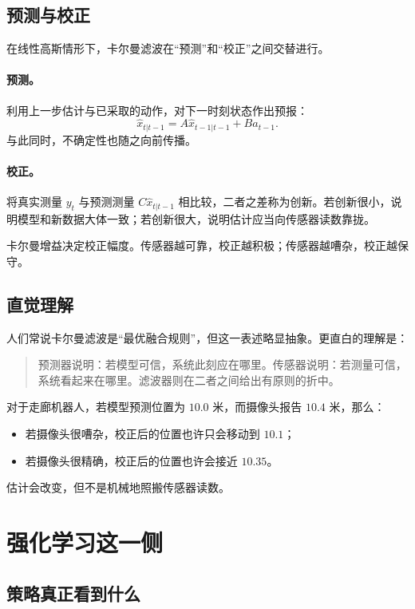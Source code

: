\documentclass[12pt,a4paper]{ctexart}
\begin{document}
\subsection{预测与校正}

在线性高斯情形下，卡尔曼滤波在“预测”和“校正”之间交替进行。

\paragraph{预测。}
利用上一步估计与已采取的动作，对下一时刻状态作出预报：
\[
\hat{x}_{t|t-1} = A \hat{x}_{t-1|t-1} + B a_{t-1}.
\]
与此同时，不确定性也随之向前传播。

\paragraph{校正。}
将真实测量 \(y_t\) 与预测测量 \(C\hat{x}_{t|t-1}\) 相比较，二者之差称为创新。若创新很小，说明模型和新数据大体一致；若创新很大，说明估计应当向传感器读数靠拢。

卡尔曼增益决定校正幅度。传感器越可靠，校正越积极；传感器越嘈杂，校正越保守。

\subsection{直觉理解}

人们常说卡尔曼滤波是“最优融合规则”，但这一表述略显抽象。更直白的理解是：

\begin{quote}
预测器说明：若模型可信，系统此刻应在哪里。传感器说明：若测量可信，系统看起来在哪里。滤波器则在二者之间给出有原则的折中。
\end{quote}

对于走廊机器人，若模型预测位置为 \(10.0\) 米，而摄像头报告 \(10.4\) 米，那么：
\begin{itemize}
  \item 若摄像头很嘈杂，校正后的位置也许只会移动到 \(10.1\)；
  \item 若摄像头很精确，校正后的位置也许会接近 \(10.35\)。
\end{itemize}

估计会改变，但不是机械地照搬传感器读数。

\section{强化学习这一侧}

\subsection{策略真正看到什么}
\end{document}

